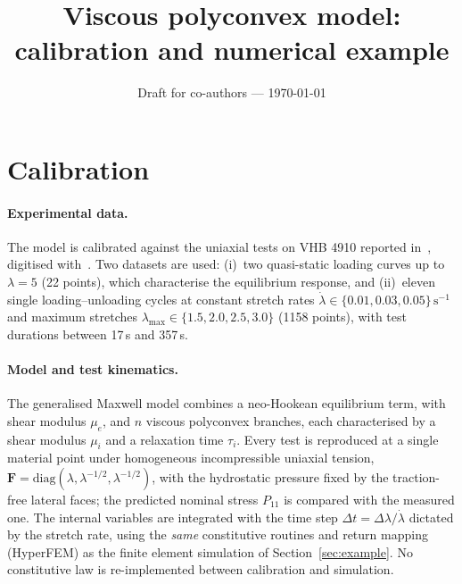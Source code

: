 \documentclass[11pt,a4paper]{article}
\title{Viscous polyconvex model:\\ calibration and numerical example}
\author{}
\date{Draft for co-authors --- \today}
\newcommand{\F}{\bm{F}}
\begin{document}
\maketitle

\section{Calibration}\label{sec:calibration}

\paragraph{Experimental data.}
The model is calibrated against the uniaxial tests on VHB 4910 reported in~\cite{Hossain2012}, digitised with~\cite{WPD}. Two datasets are used:
(i)~two quasi-static loading curves up to $\lambda=5$ (22 points), which characterise the equilibrium response, and
(ii)~eleven single loading--unloading cycles at constant stretch rates $\dot\lambda\in\{0.01,0.03,0.05\}\,\mathrm{s^{-1}}$ and maximum stretches $\lambda_{\max}\in\{1.5,2.0,2.5,3.0\}$ (1158 points), with test durations between 17\,s and 357\,s.

\paragraph{Model and test kinematics.}
The generalised Maxwell model combines a neo-Hookean equilibrium term, with shear modulus $\mu_e$, and $n$ viscous polyconvex branches, each characterised by a shear modulus $\mu_i$ and a relaxation time $\tau_i$.
Every test is reproduced at a single material point under homogeneous incompressible uniaxial tension, $\F=\mathrm{diag}(\lambda,\lambda^{-1/2},\lambda^{-1/2})$, with the hydrostatic pressure fixed by the traction-free lateral faces; the predicted nominal stress $P_{11}$ is compared with the measured one.
The internal variables are integrated with the time step $\Delta t=\Delta\lambda/\dot\lambda$ dictated by the stretch rate, using the \emph{same} constitutive routines and return mapping (HyperFEM) as the finite element simulation of Section~\ref{sec:example}. No constitutive law is re-implemented between calibration and simulation.
\end{document}
